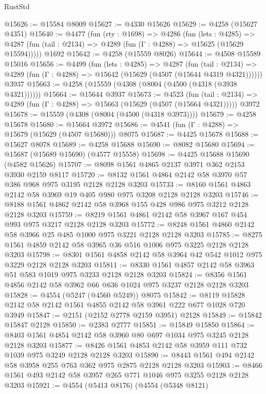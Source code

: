 \begin{lexlean}{RustStd}
\begin{coremodule}
@15626 := @15584 @8009
@15627 := @4330 @15626
@15629 := @4258 (@15627 @4351)
@15640 := @4477
    (fun (rty : @1698) =>
    @4286
      (fun (lets : @4285) =>
      @4287 (fun (tail : @2134) => @4289 (fun (Γ : @4288) => @15625 (@15629 @15594)))))
    @1692
@15642 := @4258 (@15559 @8026)
@15644 := @4508 @15589 @15016
@15656 := @4499
    (fun (lets : @4285) =>
    @4287
      (fun (tail : @2134) =>
      @4289 (fun (Γ : @4288) => @15642 (@15629 (@4507 (@15644 @4319 @4321))))))
    @3937
@15663 := @4258 (@15559 (@4308 (@8004 (@4500 (@4318 (@3938 @4321))))))
@15664 := @15644 @3937
@15673 := @4523
    (fun (tail : @2134) => @4289 (fun (Γ : @4288) => @15663 (@15629 (@4507 (@15664 @4321)))))
    @3972
@15678 := @15559 (@4308 (@8004 (@4500 (@4318 @3973))))
@15679 := @4258 @15678
@15680 := @15664 @3972
@15686 := @4541 (fun (Γ : @4288) => @15679 (@15629 (@4507 @15680))) @8075
@15687 := @4425 @15678
@15688 := @15627 @8078
@15689 := @4258 @15688
@15690 := @8082 @15680
@15694 := @15687 (@15689 @15690) (@4577 @15558)
@15698 := @4425 @15688 @15690 (@4582 @15626)
@15707 := @8098 @1561 @4865 @2137 @3971 @362 @2153 @3930 @2159 @8117
@15720 := @8132 @1561 @4864 @2142 @58 @3970 @57 @386 @968 @975 @3195 @2128 @2128 @3203
@15733 := @8160 @1561 @4863 @2142 @58 @3969 @19 @405 @980 @975 @3208 @2128 @2128 @3203
@15746 := @8188 @1561 @4862 @2142 @58 @3968 @155 @428 @986 @975 @3212 @2128 @2128 @3203
@15759 := @8219 @1561 @4861 @2142 @58 @3967 @167 @454 @993 @975 @3217 @2128 @2128 @3203
@15772 := @8248 @1561 @4860 @2142 @58 @3966 @25 @485 @1000 @975 @3221 @2128 @2128 @3203
@15785 := @8275 @1561 @4859 @2142 @58 @3965 @36 @516 @1006 @975 @3225 @2128 @2128 @3203
@15798 := @8301 @1561 @4858 @2142 @58 @3964 @42 @542 @1012 @975 @3229 @2128 @2128 @3203
@15811 := @8330 @1561 @4857 @2142 @58 @3963 @51 @583 @1019 @975 @3233 @2128 @2128 @3203
@15824 := @8356 @1561 @4856 @2142 @58 @3962 @66 @636 @1024 @975 @3237 @2128 @2128 @3203
@15828 := @4554 (@5247 (@4560 @5249)) @8075
@15842 := @8119 @15828 @2142 @58 @2142 @1561 @4855 @2142 @58 @3961 @222 @677 @1028 @720 @3949
@15847 := @2151 (@2152 @2778 @2159 @3951) @2128
@15849 := @15842 @15847 @2128
@15850 := @2383 @2777
@15851 := @15849 @15850
@15864 := @8403 @1561 @4854 @2142 @58 @3960 @80 @697 @1034 @975 @3245 @2128 @2128 @3203
@15877 := @8426 @1561 @4853 @2142 @58 @3959 @111 @732 @1039 @975 @3249 @2128 @2128 @3203
@15890 := @8443 @1561 @494 @2142 @58 @3958 @255 @763 @362 @975 @2875 @2128 @2128 @3203
@15903 := @8466 @1561 @493 @2142 @58 @3957 @265 @771 @1046 @975 @3255 @2128 @2128 @3203
@15921 := @4554
    (@5413 @8176)
    (@4554
      (@5348 @8121)

\end{coremodule}
\end{lexlean}
